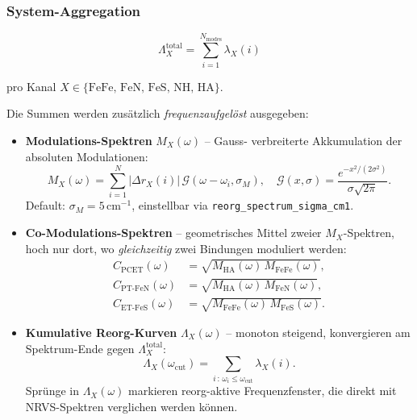 \documentclass[11pt,a4paper,twoside]{article}
\theoremstyle{remark}
\begin{document}
\subsubsection*{System-Aggregation}

\begin{equation}
  \Lambda_X^\text{total} = \sum_{i=1}^{N_\text{modes}} \lambda_X(i)
  \label{eq:lambda-total}
\end{equation}

pro Kanal $X \in \{\text{FeFe, FeN, FeS, NH, HA}\}$.

Die Summen werden zus\"atzlich \emph{frequenzaufgel\"ost} ausgegeben:

\begin{itemize}
  \item \textbf{Modulations-Spektren} $M_X(\omega)$ -- Gauss-
        verbreiterte Akkumulation der absoluten Modulationen:
        \begin{equation}
          M_X(\omega)
          = \sum_{i=1}^{N} |\Delta r_X(i)|\,
            \mathcal{G}(\omega - \omega_i, \sigma_M),
          \quad
          \mathcal{G}(x,\sigma) = \frac{e^{-x^2/(2\sigma^2)}}{\sigma\sqrt{2\pi}}.
          \label{eq:M-spectrum}
        \end{equation}
        Default: $\sigma_M = 5$\,cm$^{-1}$, einstellbar via
        \texttt{reorg\_spectrum\_sigma\_cm1}.

  \item \textbf{Co-Modulations-Spektren} -- geometrisches Mittel
        zweier $M_X$-Spektren, hoch nur dort, wo \emph{gleichzeitig}
        zwei Bindungen moduliert werden:
        \begin{align}
          C_\text{PCET}(\omega) &= \sqrt{M_\text{HA}(\omega)\, M_\text{FeFe}(\omega)},\\
          C_{\text{PT-FeN}}(\omega) &= \sqrt{M_\text{HA}(\omega)\, M_\text{FeN}(\omega)},\\
          C_{\text{ET-FeS}}(\omega) &= \sqrt{M_\text{FeFe}(\omega)\, M_\text{FeS}(\omega)}.
        \end{align}

  \item \textbf{Kumulative Reorg-Kurven} $\Lambda_X(\omega)$ -- monoton
        steigend, konvergieren am Spektrum-Ende gegen $\Lambda_X^\text{total}$:
        \begin{equation}
          \Lambda_X(\omega_\text{cut})
          = \sum_{i\,:\,\omega_i \le \omega_\text{cut}} \lambda_X(i).
        \end{equation}
        Spr\"unge in $\Lambda_X(\omega)$ markieren reorg-aktive
        Frequenzfenster, die direkt mit NRVS-Spektren verglichen
        werden k\"onnen.
\end{itemize}
\end{document}
